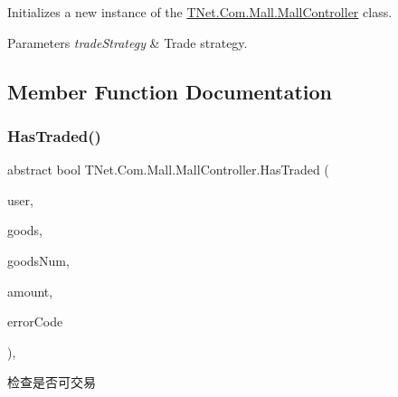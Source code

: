 Initializes a new instance of the \mbox{\hyperlink{class_t_net_1_1_com_1_1_mall_1_1_mall_controller}{T\+Net.\+Com.\+Mall.\+Mall\+Controller}} class. 


\begin{DoxyParams}{Parameters}
{\em trade\+Strategy} & Trade strategy.\\
\hline
\end{DoxyParams}


\subsection{Member Function Documentation}
\mbox{\label{class_t_net_1_1_com_1_1_mall_1_1_mall_controller_ac3b0d39cba36e863413c9e192f6e98a5}} 
\subsubsection{\texorpdfstring{Has\+Traded()}{HasTraded()}}
{\footnotesize\ttfamily abstract bool T\+Net.\+Com.\+Mall.\+Mall\+Controller.\+Has\+Traded (\begin{DoxyParamCaption}\item[{\mbox{\hyperlink{class_t_net_1_1_context___1_1_base_user}{Base\+User}}}]{user,  }\item[{\mbox{\hyperlink{class_t_net_1_1_com_1_1_model_1_1_goods_data}{Goods\+Data}}}]{goods,  }\item[{int}]{goods\+Num,  }\item[{out double}]{amount,  }\item[{out \mbox{\hyperlink{namespace_t_net_1_1_com_1_1_mall_a8ed58f71da1d1495830104612fc5667a}{Trade\+Error\+Code}}}]{error\+Code }\end{DoxyParamCaption})\hspace{0.3cm}{\ttfamily [protected]}, {}}



检查是否可交易 


